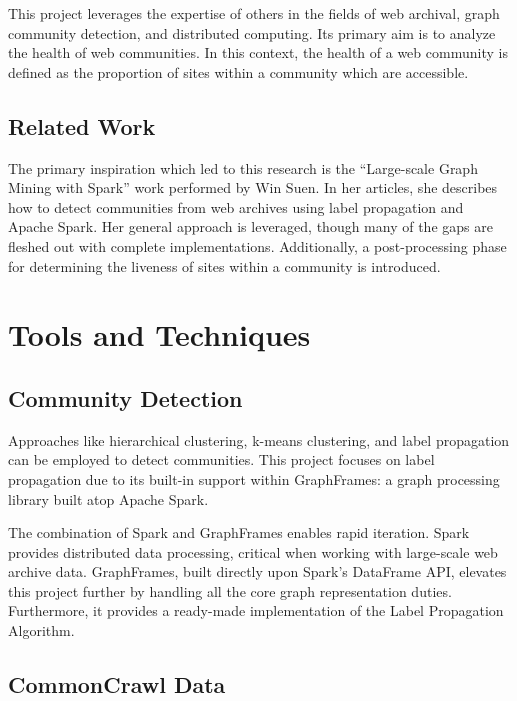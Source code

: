 \documentclass[conference]{IEEEtran}
\begin{document}
This project leverages the expertise of others in the fields of web archival, graph community detection, and distributed computing. Its primary aim is to analyze the health of web communities. In this context, the health of a web community is defined as the proportion of sites within a community which are accessible.

\subsection{Related Work}

The primary inspiration which led to this research is the ``Large-scale Graph Mining with Spark'' work performed by Win Suen. In her articles\cite{largeScaleGraphMiningWithSpark1}\cite{largeScaleGraphMiningWithSpark2}, she describes how to detect communities from web archives using label propagation and Apache Spark. Her general approach is leveraged, though many of the gaps are fleshed out with complete implementations. Additionally, a post-processing phase for determining the liveness of sites within a community is introduced.

\section{Tools and Techniques}

\subsection{Community Detection}

Approaches like hierarchical clustering, k-means clustering, and label propagation can be employed to detect communities. This project focuses on label propagation due to its built-in support within GraphFrames: a graph processing library built atop Apache Spark.

The combination of Spark and GraphFrames enables rapid iteration. Spark provides distributed data processing, critical when working with large-scale web archive data. GraphFrames, built directly upon Spark's DataFrame API, elevates this project further by handling all the core graph representation duties. Furthermore, it provides a ready-made implementation of the Label Propagation Algorithm.

\subsection{CommonCrawl Data}
\end{document}
